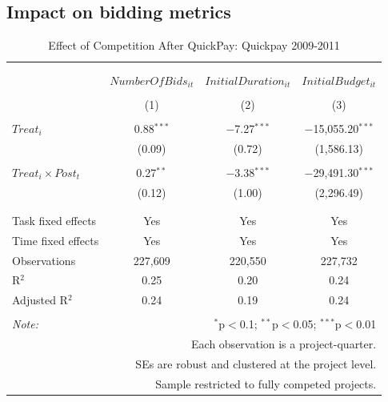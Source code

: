 \documentclass[
]{article}
\begin{document}
\hypertarget{impact-on-bidding-metrics}{%
\subsection{Impact on bidding metrics}\label{impact-on-bidding-metrics}}

\begin{table}[H] \centering 
  \caption{Effect of Competition After QuickPay: Quickpay 2009-2011} 
  \label{} 
\small 
\begin{tabular}{@{\extracolsep{0pt}}lccc} 
\\[-1.8ex]\hline 
\hline \\[-1.8ex] 
\\[-1.8ex] & $NumberOfBids_{it}$ & $InitialDuration_{it}$ & $InitialBudget_{it}$ \\ 
\\[-1.8ex] & (1) & (2) & (3)\\ 
\hline \\[-1.8ex] 
 $Treat_i$ & 0.88$^{***}$ & $-$7.27$^{***}$ & $-$15,055.20$^{***}$ \\ 
  & (0.09) & (0.72) & (1,586.13) \\ 
  & & & \\ 
 $Treat_i \times Post_t$ & 0.27$^{**}$ & $-$3.38$^{***}$ & $-$29,491.30$^{***}$ \\ 
  & (0.12) & (1.00) & (2,296.49) \\ 
  & & & \\ 
\hline \\[-1.8ex] 
Task fixed effects & Yes & Yes & Yes \\ 
Time fixed effects & Yes & Yes & Yes \\ 
Observations & 227,609 & 220,550 & 227,732 \\ 
R$^{2}$ & 0.25 & 0.20 & 0.24 \\ 
Adjusted R$^{2}$ & 0.24 & 0.19 & 0.24 \\ 
\hline 
\hline \\[-1.8ex] 
\textit{Note:}  & \multicolumn{3}{r}{$^{*}$p$<$0.1; $^{**}$p$<$0.05; $^{***}$p$<$0.01} \\ 
 & \multicolumn{3}{r}{Each observation is a project-quarter.} \\ 
 & \multicolumn{3}{r}{SEs are robust and clustered at the project level.} \\ 
 & \multicolumn{3}{r}{Sample restricted to fully competed projects.} \\ 
\end{tabular} 
\end{table}
\end{document}
